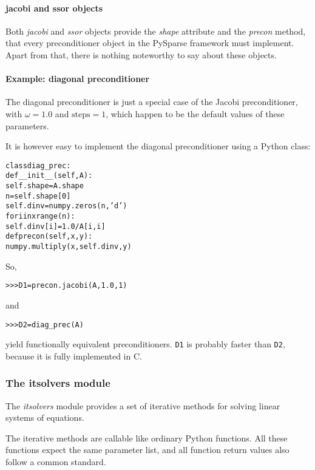 \documentclass[a4paper]{article}
\newlength{\pyindent} \newlength{\pyminipagewidth}
\newenvironment{pycode}{\begin{trivlist}\item\hspace*{\pyindent}\begin{minipage}{\pyminipagewidth}\small\begin{alltt}}
      {\end{alltt}\end{minipage}\end{trivlist}}
\newenvironment{pyinline}{\begin{trivlist}\item\hspace*{\pyindent}\begin{minipage}{\pyminipagewidth}\small\begin{alltt}}
      {\end{alltt}\end{minipage}\end{trivlist}}
\begin{document}
\paragraph{jacobi and ssor objects}
%
Both \textit{jacobi} and \textit{ssor} objects provide the
\textit{shape} attribute and the \textit{precon} method, that every
preconditioner object in the PySparse framework must implement.  Apart
from that, there is nothing noteworthy to say about these objects.

\paragraph{Example: diagonal preconditioner}
%
The diagonal preconditioner is just a special case of the Jacobi
preconditioner, with $\omega=1.0$ and $\text{steps}=1$, which happen
to be the default values of these parameters.

It is however easy to implement the diagonal preconditioner using a
Python class:
\begin{pycode}
class diag_prec:
    def __init__(self, A):
        self.shape = A.shape
        n = self.shape[0]
        self.dinv = numpy.zeros(n, 'd')
        for i in xrange(n):
            self.dinv[i] = 1.0 / A[i,i]
    def precon(self, x, y):
        numpy.multiply(x, self.dinv, y)
\end{pycode}
So,
\begin{pyinline}
>>> D1 = precon.jacobi(A, 1.0, 1)
\end{pyinline}
and
\begin{pyinline}
>>> D2 = diag_prec(A)
\end{pyinline}
yield functionally equivalent preconditioners. \texttt{D1} is probably
faster than \texttt{D2}, because it is fully implemented in C.

\subsubsection{The itsolvers module}
\label{sec:python:itsolvers}
%
The \textit{itsolvers} module provides a set of iterative methods for
solving linear systems of equations.

The iterative methods are callable like ordinary Python functions. All
these functions expect the same parameter list, and all function
return values also follow a common standard.
\end{document}
